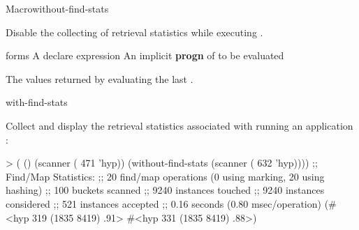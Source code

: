 \documentclass[10pt,twoside,english,pdftex]{article}
\begin{document}
\begin{functiondoc}{Macro}{without-find-stats}%
  {\superstar{}
    \superstar{}
    \returns{} \superstar} 
%
%
%
  
\fnsyntax

\fnpurpose 
{}%
%
Disable the collecting of retrieval statistics while executing .

\fnpackage {}

\fnmodule {}

\fnargs
\begin{args}{forms}
\arg[declaration] A declare expression
\arg[forms] An implicit \textbf{progn} of  to be evaluated
\end{args}

\fnreturns The values returned by evaluating the last .

\begin{alsos}{with-find-stats}
\end{alsos}

\fnexample
{}%
%
Collect and display the retrieval statistics associated with
running an application  :
\begin{example}
> ( ()
     (scanner ( 471 'hyp))
     (without-find-stats
        (scanner ( 632 'hyp))))
;; Find/Map Statistics:
;;        20 find/map operations (0 using marking, 20 using hashing)
;;       100 buckets scanned
;;      9240 instances touched
;;      9240 instances considered
;;       521 instances accepted
;;      0.16 seconds (0.80 msec/operation)
(#<hyp 319 (1835 8419) .91>
 #<hyp 331 (1835 8419) .88>)
\end{example}

\end{functiondoc}


\T\markright{}%
\T\pagestyle{plain}
\T\cleardoublepage
\W{}
\T\pagestyle{fancy}
\T\thispagestyle{fancybottom}
\T\global\def\fnlastname{ }%
\T\renewcommand{\headrulewidth}{0pt}
\end{document}
